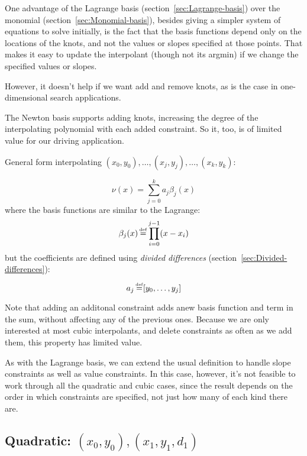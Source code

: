 One advantage of the Lagrange basis 
(section~\ref{sec:Lagrange-basis})
over the monomial (section~\ref{sec:Monomial-basis}),
besides giving a simpler system of equations to solve initially,
is the fact that the basis functions depend only on the locations
of the knots, and not the values or slopes specified at those 
points. 
That makes it easy to update the interpolant 
(though not its argmin) if we change the specified values
or slopes.
 
However, it doesn't help if we want add and remove knots,
as is the case in one-dimensional search applications.

The Newton basis supports adding knots, increasing the degree
of the interpolating polynomial with each added constraint.
So it, too, is of limited value for our driving application.

General form interpolating 
$(x_{0},y_{0}),\ldots ,(x_{j},y_{j}),\ldots ,(x_{k},y_{k})$:

\begin{equation}
\nu(x) = \sum _{{j=0}}^{{k}}a_{{j}} {\beta}_{{j}}(x)
\end{equation}
where the basis functions are similar to the Lagrange:
\begin{equation}
{\beta}_{j}(x) \operatorname*{\overset{\underset{\mathrm{def}}{}}{=}} \prod_{{i=0}}^{{j-1}}(x-x_{i})
\end{equation}
but the coefficients are defined using 
\textit{divided differences} 
(section~\ref{sec:Divided-differences}):
\begin{equation}
a_{j} \operatorname*{\overset{\underset{\mathrm{def}}{}}{=}} [y_{0},\ldots ,y_{j}] 
\end{equation}

Note that adding an additonal constraint
adds anew basis function and term in the sum, without affecting 
any of the previous ones.
Because we are only interested at most cubic interpolants,
and delete constraints as often as we add them,
this property has limited value.

As with the Lagrange basis, we can extend the usual definition
to handle slope constraints as well as value constraints.
In this case, however, it's not feasible to work through
all the quadratic and cubic cases, since the result depends
on the order in which constraints are specified, not just
how many of each kind there are.

\subsection{Quadratic: $(x_0,y_0),(x_1,y_1,d_1)$}


